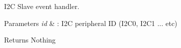 I2\-C Slave event handler. 


\begin{DoxyParams}{Parameters}
{\em id} & \-: I2\-C peripheral I\-D (I2\-C0, I2\-C1 ... etc) \\
\hline
\end{DoxyParams}
\begin{DoxyReturn}{Returns}
Nothing 
\end{DoxyReturn}
